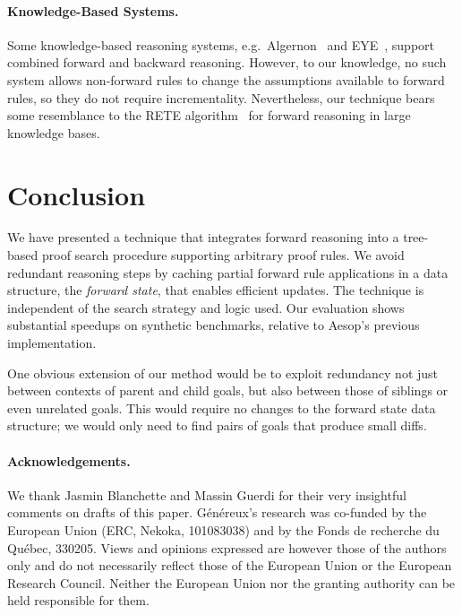 \documentclass[runningheads,leqno]{llncs}
\newcommand{\para}[1]{\paragraph{\bfseries\upshape #1}}
\begin{document}
\para{Knowledge-Based Systems.}
Some knowledge-based reasoning systems, e.g.\ Algernon~\cite{Algernon} and EYE~\cite{EYE}, support combined forward and backward reasoning.
However, to our knowledge, no such system allows non-forward rules to change the assumptions available to forward rules, so they do not require incrementality.
Nevertheless, our technique bears some resemblance to the RETE algorithm~\cite{RETE} for forward reasoning in large knowledge bases.

\section{Conclusion}

We have presented a technique that integrates forward reasoning into a tree-based proof search procedure supporting arbitrary proof rules.
We avoid redundant reasoning steps by caching partial forward rule applications in a data structure, the \emph{forward state}, that enables efficient updates.
The technique is independent of the search strategy and logic used.
Our evaluation shows substantial speedups on synthetic benchmarks, relative to Aesop's previous implementation.

One obvious extension of our method would be to exploit redundancy not just between contexts of parent and child goals, but also between those of siblings or even unrelated goals.
This would require no changes to the forward state data structure; we would only need to find pairs of goals that produce small diffs.

\para{Acknowledgements.}
We thank Jasmin Blanchette and Massin Guerdi for their very insightful comments on drafts of this paper.
Généreux's research was co-funded by the European Union (ERC, Nekoka, 101083038) and by the Fonds de recherche du Québec, 330205. Views and opinions expressed are however those of the authors only and do not necessarily reflect those of the European Union or the European Research Council. Neither the European Union nor the granting authority can be held responsible for them.


\end{document}
